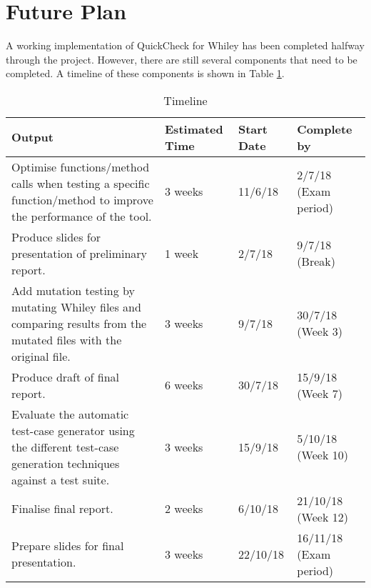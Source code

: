 \section{Future Plan}\label{section:future}


A working implementation of QuickCheck for Whiley has been completed halfway through the project. However, there are still several components that need to be completed.
A timeline of these components is shown in Table \ref{table:timeline}.

\begin{table}[H]
	  \centering
\begin{tabular}{ |p{10cm}|p{2cm}|p{2cm}|p{2cm}| }
\hline
\textbf{Output} & \textbf{Estimated Time} & \textbf{Start Date} & \textbf{Complete by}\\
\hline
Optimise functions/method calls when testing a specific function/method to improve the performance of the tool. & 3 weeks & 11/6/18 & 2/7/18 (Exam period) \\
\hline
Produce slides for presentation of preliminary report. & 1 week & 2/7/18 & 9/7/18 (Break)\\
\hline
Add mutation testing by mutating Whiley files and comparing results from the mutated files with the original file. & 3 weeks & 9/7/18 & 30/7/18 (Week 3)\\
\hline
Produce draft of final report. & 6 weeks & 30/7/18 & 15/9/18 (Week 7)\\
\hline
Evaluate the automatic test-case generator using the different test-case generation techniques against a test suite. & 3 weeks & 15/9/18 & 5/10/18 (Week 10) \\
\hline
Finalise final report. & 2 weeks & 6/10/18 & 21/10/18 (Week 12) \\
\hline
Prepare slides for final presentation. & 3 weeks & 22/10/18 & 16/11/18 (Exam period)\\
\hline
\end{tabular}

\caption{Timeline}
\label{table:timeline}

\end{table}

